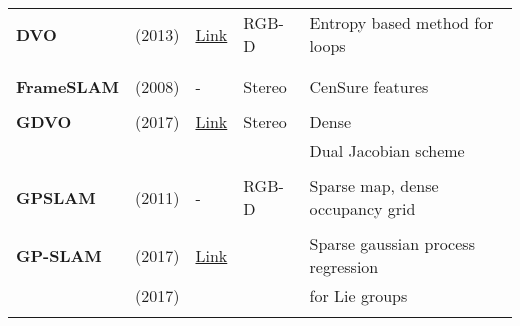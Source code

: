 \documentclass[a4paper,12pt]{scrartcl}
\begin{document}
{\begin{longtable}{l|l|l|l|l}
    \textbf{DVO}           & \cite{Kerl2013} (2013)            & {\href{https://github.com/tum-vision/dvo_slam}{Link}}              & RGB-D                 & Entropy based method for loops\\
                           &                                   &                                                                    &                       &\\
                           &                                   &                                                                    &                       &\\
    \textbf{FrameSLAM}     & \cite{Konolige2008} (2008)        & -                                                                  & Stereo                & CenSure features\\
                           &                                   &                                                                    &                       &\\
    \textbf{GDVO}          & \cite{Zhu2017} (2017)             & {\href{https://github.com/syywh/gdvo}{Link}}                       & Stereo                & Dense\\
                           &                                   &                                                                    &                       & Dual Jacobian scheme\\
                           &                                   &                                                                    &                       &\\
    \textbf{GPSLAM}        & \cite{Pirker2011a} (2011)         & -                                                                  & RGB-D                 & Sparse map, dense occupancy grid\\
                           &                                   &                                                                    &                       &\\
    \textbf{GP-SLAM}       & \cite{Yan2017} (2017)             & {\href{https://github.com/gtrll/gpslam}{Link}}                     &                       & Sparse gaussian process regression\\
                           & \cite{Dong2017} (2017)            &                                                                    &                       & for Lie groups\\
                           &                                   &                                                                    &                       &\\

\end{longtable}}
\end{document}
